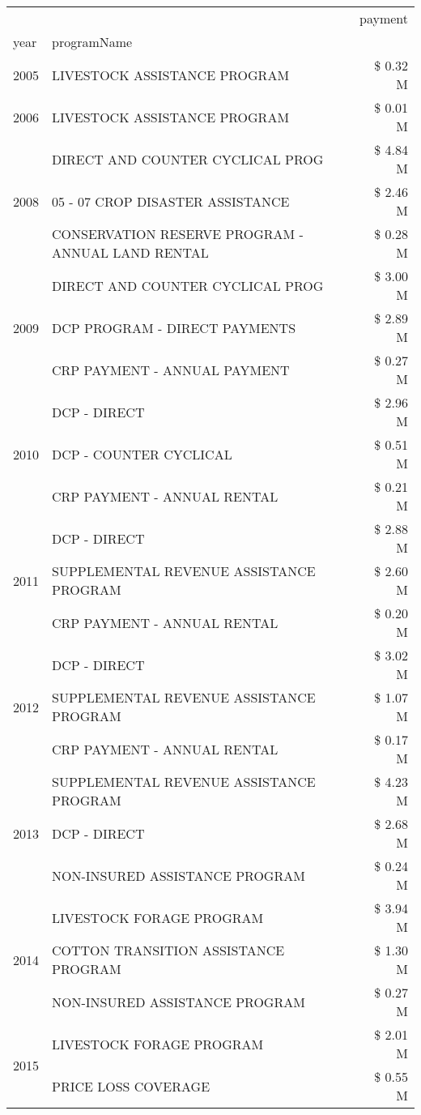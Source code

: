 \begin{tabular}{llr}
\toprule
 &  & payment \\
year & programName &  \\
\midrule
2005 & LIVESTOCK ASSISTANCE PROGRAM & \$ 0.32 M \\
\cline{1-3}
2006 & LIVESTOCK ASSISTANCE PROGRAM & \$ 0.01 M \\
\cline{1-3}
\multirow[t]{3}{*}{2008} & DIRECT AND COUNTER CYCLICAL PROG & \$ 4.84 M \\
 & 05 - 07 CROP DISASTER ASSISTANCE & \$ 2.46 M \\
 & CONSERVATION RESERVE PROGRAM - ANNUAL LAND RENTAL & \$ 0.28 M \\
\cline{1-3}
\multirow[t]{3}{*}{2009} & DIRECT AND COUNTER CYCLICAL PROG & \$ 3.00 M \\
 & DCP PROGRAM - DIRECT PAYMENTS & \$ 2.89 M \\
 & CRP PAYMENT - ANNUAL PAYMENT & \$ 0.27 M \\
\cline{1-3}
\multirow[t]{3}{*}{2010} & DCP - DIRECT & \$ 2.96 M \\
 & DCP - COUNTER CYCLICAL & \$ 0.51 M \\
 & CRP PAYMENT - ANNUAL RENTAL & \$ 0.21 M \\
\cline{1-3}
\multirow[t]{3}{*}{2011} & DCP - DIRECT & \$ 2.88 M \\
 & SUPPLEMENTAL REVENUE ASSISTANCE PROGRAM & \$ 2.60 M \\
 & CRP PAYMENT - ANNUAL RENTAL & \$ 0.20 M \\
\cline{1-3}
\multirow[t]{3}{*}{2012} & DCP - DIRECT & \$ 3.02 M \\
 & SUPPLEMENTAL REVENUE ASSISTANCE PROGRAM & \$ 1.07 M \\
 & CRP PAYMENT - ANNUAL RENTAL & \$ 0.17 M \\
\cline{1-3}
\multirow[t]{3}{*}{2013} & SUPPLEMENTAL REVENUE ASSISTANCE PROGRAM & \$ 4.23 M \\
 & DCP - DIRECT & \$ 2.68 M \\
 & NON-INSURED ASSISTANCE PROGRAM & \$ 0.24 M \\
\cline{1-3}
\multirow[t]{3}{*}{2014} & LIVESTOCK FORAGE PROGRAM & \$ 3.94 M \\
 & COTTON TRANSITION ASSISTANCE PROGRAM & \$ 1.30 M \\
 & NON-INSURED ASSISTANCE PROGRAM & \$ 0.27 M \\
\cline{1-3}
\multirow[t]{3}{*}{2015} & LIVESTOCK FORAGE PROGRAM & \$ 2.01 M \\
 & PRICE LOSS COVERAGE & \$ 0.55 M \\

\end{tabular}
